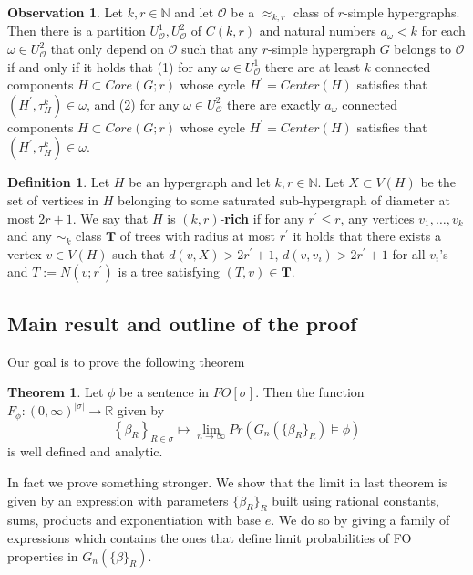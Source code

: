 \documentclass[12pt,notitlepage,a4paper]{article}
\theoremstyle{definition}
\newtheorem{theorem}{Theorem}[section]
\newtheorem{obs}{Observation}[section]
\newtheorem{definition}{Definition}[section]
\newcommand{\R}{\mathbb{R}}
\newcommand{\N}{\mathbb{N}}
\newcommand{\Ln}{\lim\limits_{n\to \infty}}
\newcommand{\InR}[1]{\left\{ #1_R \right\}_{R\in \sigma}}
\begin{document}
\begin{obs}\label{obs:agreeablecores}
	Let $k,r\in\N$ and let $\mathcal{O}$ be a $\approx_{k,r}$ class
	of $r$-simple hypergraphs. 
	Then there is a partition $U^1_\mathcal{O},
	U^2_\mathcal{O}$ of $C(k,r)$ and natural numbers $a_\omega<k$
	for each $\omega\in U^2_\mathcal{O}$ that only depend on 
	$\mathcal{O}$ such that any $r$-simple hypergraph $G$ belongs to
	$\mathcal{O}$ if and only if it holds that (1) for any $\omega\in U^1_\mathcal{O}$ 
	there are at least $k$ connected components $H \subset Core(G;r)$ whose cycle 		
	$H^\prime=Center(H)$ satisfies that	$(H^{\prime},\tau^k_{H})\in \omega$, and
	(2) for any $\omega\in U^2_\mathcal{O}$ there are exactly $a_\omega$ 
	connected components $H \subset Core(G;r)$ whose cycle 
	$H^\prime=Center(H)$ satisfies that	$(H^{\prime},\tau^k_{H})\in \omega$.	
\end{obs}


\begin{definition} \label{def:rich}
	Let $H$ be an hypergraph and let $k,r\in\N$. Let
	$X\subset V(H)$ be the set of vertices in $H$
	belonging to some saturated sub-hypergraph of diameter
	at most $2r+1$.	We say that $H$ is $(k,r)$-\textbf{rich}
	if for any $r^\prime\leq r$, any vertices $v_1,\dots, v_k$ 
	and any $\sim_k$ class $\mathbf{T}$ of trees with radius
	at most $r^\prime$ it holds that there exists a vertex $v\in V(H)$
	such that $d(v,X)> 2r^\prime+1$, $d(v,v_i)>2r^\prime+1$ for all
	$v_i$'s and $T:=N(v;r^\prime)$ is a tree satisfying
	$(T,v)\in \mathbf{T}$.	
\end{definition}





\subsection{Main result and outline of the proof}
Our goal is to prove the following theorem

\begin{theorem} \label{thm:main}
	Let $\phi$ be a sentence in $FO[\sigma]$. Then
	the function
	$F_\phi: (0,\infty)^{|\sigma|}
	\rightarrow \R$ given by 
	\[
	\InR{\beta} \mapsto \Ln Pr\left( G_n\left(
	\{\beta_R\}_R\right) \models \phi\right)
	\]
	is well defined and analytic. 
\end{theorem}
In fact we prove something stronger. We show that the limit
in last theorem is given by an expression with parameters $\{\beta_R\}_R$
built using rational constants, sums, products and exponentiation with base $e$.
We do so by giving a family of expressions which contains the ones that define 
limit probabilities of FO properties in $G_n(\{\beta\}_R)$.  \par
\end{document}
